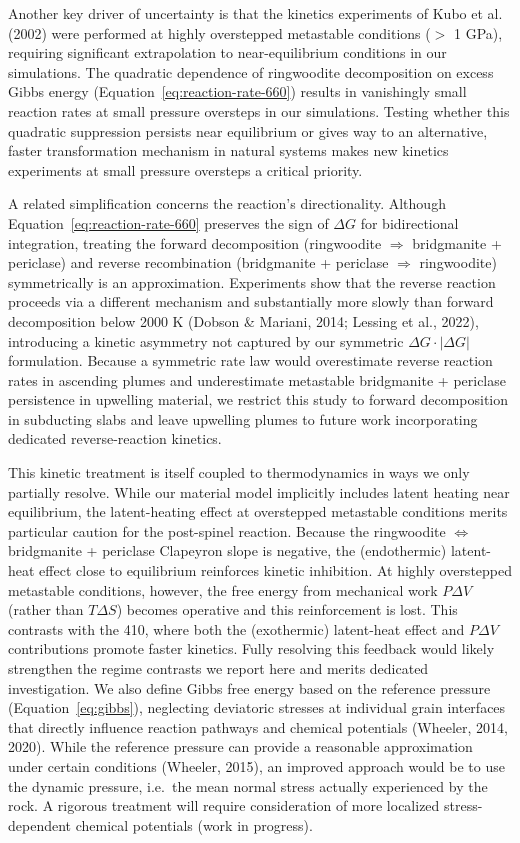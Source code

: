 \documentclass[draft,linenumbers]{agujournal2019}
\begin{document}
Another key driver of uncertainty is that the kinetics experiments of
Kubo et al. (2002) were performed at highly overstepped metastable
conditions (\(>\) 1 GPa), requiring significant extrapolation to
near-equilibrium conditions in our simulations. The quadratic dependence
of ringwoodite decomposition on excess Gibbs energy
(Equation~\ref{eq:reaction-rate-660}) results in vanishingly small
reaction rates at small pressure oversteps in our simulations. Testing
whether this quadratic suppression persists near equilibrium or gives
way to an alternative, faster transformation mechanism in natural
systems makes new kinetics experiments at small pressure oversteps a
critical priority.

A related simplification concerns the reaction's directionality.
Although Equation~\ref{eq:reaction-rate-660} preserves the sign of
\(\Delta G\) for bidirectional integration, treating the forward
decomposition (ringwoodite \(\Rightarrow\) bridgmanite + periclase) and
reverse recombination (bridgmanite + periclase \(\Rightarrow\)
ringwoodite) symmetrically is an approximation. Experiments show that
the reverse reaction proceeds via a different mechanism and
substantially more slowly than forward decomposition below 2000 K
(Dobson \& Mariani, 2014; Lessing et al., 2022), introducing a kinetic
asymmetry not captured by our symmetric \(\Delta G \cdot |\Delta G|\)
formulation. Because a symmetric rate law would overestimate reverse
reaction rates in ascending plumes and underestimate metastable
bridgmanite + periclase persistence in upwelling material, we restrict
this study to forward decomposition in subducting slabs and leave
upwelling plumes to future work incorporating dedicated reverse-reaction
kinetics.

This kinetic treatment is itself coupled to thermodynamics in ways we
only partially resolve. While our material model implicitly includes
latent heating near equilibrium, the latent-heating effect at
overstepped metastable conditions merits particular caution for the
post-spinel reaction. Because the ringwoodite \(\Leftrightarrow\)
bridgmanite + periclase Clapeyron slope is negative, the (endothermic)
latent-heat effect close to equilibrium reinforces kinetic inhibition.
At highly overstepped metastable conditions, however, the free energy
from mechanical work \(P\Delta V\) (rather than \(T\Delta S\)) becomes
operative and this reinforcement is lost. This contrasts with the 410,
where both the (exothermic) latent-heat effect and \(P\Delta V\)
contributions promote faster kinetics. Fully resolving this feedback
would likely strengthen the regime contrasts we report here and merits
dedicated investigation. We also define Gibbs free energy based on the
reference pressure (Equation~\ref{eq:gibbs}), neglecting deviatoric
stresses at individual grain interfaces that directly influence reaction
pathways and chemical potentials (Wheeler, 2014, 2020). While the
reference pressure can provide a reasonable approximation under certain
conditions (Wheeler, 2015), an improved approach would be to use the
dynamic pressure, i.e.~the mean normal stress actually experienced by
the rock. A rigorous treatment will require consideration of more
localized stress-dependent chemical potentials (work in progress).
\end{document}

